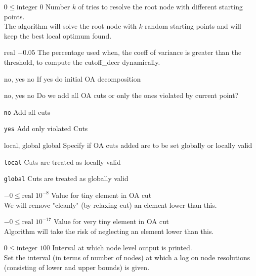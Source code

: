 %
{$0\leq\textrm{integer}$}%
{$0$}%
{Number $k$ of tries to resolve the root node with different starting points.\\
The algorithm will solve the root node with $k$ random starting points and will keep the best local optimum found.}%
{}

%
{$\textrm{real}$}%
{$-0.05$}%
{The percentage used when, the coeff of variance is greater than the threshold, to compute the cutoff\_decr dynamically.}%
{}

%
{no, yes}%
{no}%
{If yes do initial OA decomposition}%
{}

%
{no, yes}%
{no}%
{Do we add all OA cuts or only the ones violated by current point?}%
{\begin{list}{}{
\setlength{\parsep}{0em}
\setlength{\leftmargin}{5ex}
\setlength{\labelwidth}{2ex}
\setlength{\itemindent}{0ex}
\setlength{\topsep}{0pt}}
\item[\texttt{no}] Add all cuts
\item[\texttt{yes}] Add only violated Cuts
\end{list}
}

%
{local, global}%
{global}%
{Specify if OA cuts added are to be set globally or locally valid}%
{\begin{list}{}{
\setlength{\parsep}{0em}
\setlength{\leftmargin}{5ex}
\setlength{\labelwidth}{2ex}
\setlength{\itemindent}{0ex}
\setlength{\topsep}{0pt}}
\item[\texttt{local}] Cuts are treated as locally valid
\item[\texttt{global}] Cuts are treated as globally valid
\end{list}
}

%
{$-0\leq\textrm{real}$}%
{$10^{- 8}$}%
{Value for tiny element in OA cut\\
We will remove "cleanly" (by relaxing cut) an element lower than this.}%
{}

%
{$-0\leq\textrm{real}$}%
{$10^{-17}$}%
{Value for very tiny element in OA cut\\
Algorithm will take the risk of neglecting an element lower than this.}%
{}

%
{$0\leq\textrm{integer}$}%
{$100$}%
{Interval at which node level output is printed.\\
Set the interval (in terms of number of nodes) at which a log on node resolutions (consisting of lower and upper bounds) is given.}%
{}

